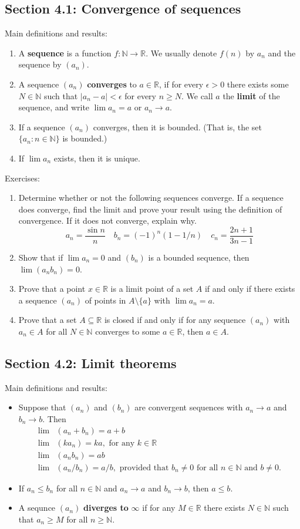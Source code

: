 \documentclass[letterpaper,12pt]{article}
\newcommand{\N}{\mathbb{N}}
\newcommand{\R}{\mathbb{R}}
\newcommand{\abs}[1]{\lvert #1\rvert}
\begin{document}
\subsection*{Section 4.1: Convergence of sequences}

Main definitions and results:
\begin{enumerate}
 \item A {\bf sequence} is a function $f:\N\to \R$. We usually denote $f(n)$ by $a_n$ and the sequence by $(a_n)$.
 \item A sequence $(a_n)$ {\bf converges} to $a\in \R$, if for every $\epsilon>0$ there exists some $N\in\N$ such that $\abs{a_n-a}<\epsilon$ for every $n\geq N$. We call $a$ the {\bf limit} of the sequence, and write $\lim a_n = a$ or $a_n\to a$.
 \item If a sequence $(a_n)$ converges, then it is bounded. (That is, the set $\{a_n : n\in\N\}$ is bounded.)
 \item If $\lim a_n$ exists, then it is unique.
\end{enumerate}

\noindent Exercises:
\begin{enumerate}
 \item Determine whether or not the following sequences converge. If a sequence does converge, find the limit and prove your result using the definition of convergence. If it does not converge, explain why.
\[
 a_n = \frac{\sin n}{n}\quad b_n = (-1)^n(1-1/n) \quad c_n = \frac{2n+1}{3n-1}
\]
 \item Show that if $\lim a_n = 0$ and $(b_n)$ is a bounded sequence, then $\lim(a_nb_n) = 0$.
 \item Prove that a point $x\in\R$ is a limit point of a set $A$ if and only if there exists a sequence $(a_n)$ of points in $A\setminus\{a\}$ with $\lim a_n = a$.
 \item Prove that a set $A\subseteq \R$ is closed if and only if for any sequence $(a_n)$ with $a_n\in A$ for all $N\in\N$ converges to some $a\in\R$, then $a\in A$.
\end{enumerate}
\subsection*{Section 4.2: Limit theorems}
Main definitions and results:
\begin{itemize}
 \item Suppose that $(a_n)$ and $(b_n)$ are convergent sequences with $a_n\to a$ and $b_n\to b$. Then
\begin{align*}
 \lim &(a_n+b_n) = a+b\\
 \lim &(ka_n) = ka, \text{ for any } k\in\R\\
 \lim &(a_nb_n) = ab\\
 \lim &(a_n/b_n) = a/b, \text{ provided that } b_n\neq 0 \text{ for all } n\in \N \text{ and } b\neq 0.
\end{align*}
 \item If $a_n\leq b_n$ for all $n\in\N$ and $a_n\to a$ and $b_n\to b$, then $a\leq b$. 
 \item A sequnce $(a_n)$ {\bf diverges to} $\infty$ if for any $M\in\R$ there exists $N\in\N$ such that $a_n\geq M$ for all $n\geq \N$.
\end{itemize}
\end{document}
